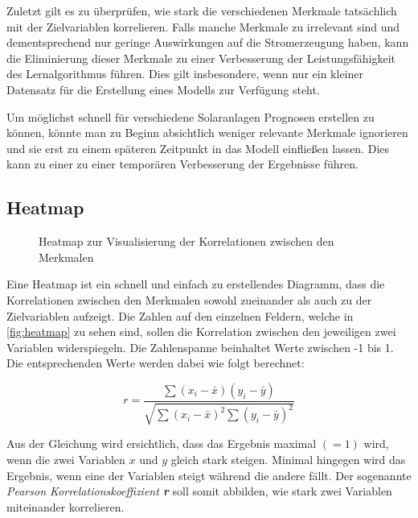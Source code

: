 \documentclass[12pt, a4paper]{article}
\begin{document}
Zuletzt gilt es zu überprüfen, wie stark die verschiedenen Merkmale tatsächlich mit der Zielvariablen korrelieren. Falls manche Merkmale zu irrelevant sind und dementsprechend nur geringe Auswirkungen auf die Stromerzeugung haben, kann die Eliminierung dieser Merkmale zu einer Verbesserung der Leistungsfähigkeit des Lernalgorithmus führen. Dies gilt insbesondere, wenn nur ein kleiner Datensatz für die Erstellung eines Modells zur Verfügung steht. 

Um möglichst schnell für verschiedene Solaranlagen Prognosen erstellen zu können, könnte man zu Beginn absichtlich weniger relevante Merkmale ignorieren und sie erst zu einem späteren Zeitpunkt in das Modell einfließen lassen. Dies kann zu einer zu einer temporären Verbesserung der Ergebnisse führen.

\subsection{Heatmap}

\begin{figure}[H]
\centering
\def\svgwidth{375pt}

\caption{Heatmap zur Visualisierung der Korrelationen zwischen den Merkmalen}
\label{fig:heatmap}
\end {figure}

Eine Heatmap ist ein schnell und einfach zu erstellendes Diagramm, dass die Korrelationen zwischen den Merkmalen sowohl zueinander als auch zu der Zielvariablen aufzeigt. Die Zahlen auf den einzelnen Feldern, welche in \autoref{fig:heatmap} zu sehen sind, sollen die Korrelation zwischen den jeweiligen zwei Variablen widerspiegeln. Die Zahlenspanne beinhaltet Werte zwischen -1 bis 1. Die entsprechenden Werte werden dabei wie folgt berechnet:

\begin{equation}
r=\frac{\sum(x_i - \bar{x})(y_i - \bar{y})}
{\sqrt{\sum(x_i - \bar{x})^2\sum(y_i -  \bar{y})^2}}
\end{equation}


Aus der Gleichung wird ersichtlich, dass das Ergebnis maximal $(=1)$ wird, wenn die zwei Variablen $x$ und $y$ gleich stark steigen. Minimal hingegen wird das Ergebnis, wenn eine der Variablen steigt während die andere fällt. Der sogenannte \textit{Pearson Korrelationskoeffizient \textbf{r}} soll somit abbilden, wie stark zwei Variablen miteinander korrelieren. 
\end{document}

